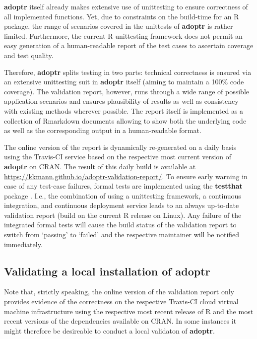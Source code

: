 \documentclass[
]{book}
\begin{document}
\textbf{adoptr} itself already makes extensive use of unittesting to
ensure correctness of all implemented functions.
Yet, due to constraints on the build-time for an R package,
the range of scenarios covered in the unittests of \textbf{adoptr} is
rather limited.
Furthermore, the current R unittesting framework does not permit
an easy generation of a human-readable report of the test cases
to ascertain coverage and test quality.

Therefore, \textbf{adoptr} splits testing in two parts: technical
correctness is ensured via an extensive unittesting suit in \textbf{adoptr}
itself (aiming to maintain a 100\% code coverage).
The validation report, however, runs through a wide range of possible
application scenarios and ensures plausibility of results as well
as consistency with existing methods wherever possible.
The report itself is implemented as a collection of Rmarkdown documents
allowing to show both the underlying code as well as the corresponding
output in a human-readable format.

The online version of the report is dynamically re-generated on a
daily basis using the Travis-CI service based on the respective
most current version of \textbf{adoptr} on CRAN.
The result of this daily build is available at
\url{https://kkmann.github.io/adoptr-validation-report/}.
To ensure early warning in case of any test-case failures,
formal tests are implemented using the \textbf{testthat} package
\citep{R-testthat}.
I.e., the combination of using a unittesting framework, a continuous
integration, and continuous deployment service leads to an always
up-to-date validation report (build on the current R release on Linux).
Any failure of the integrated formal tests will cause the build status
of the validation report to switch from `passing' to `failed' and
the respective maintainer will be notified immediately.

\hypertarget{validating-a-local-installation-of-adoptr}{%
\subsection{Validating a local installation of adoptr}\label{validating-a-local-installation-of-adoptr}}

Note that, strictly speaking, the online version of the validation
report only provides evidence of the correctness on the respective
Travis-CI cloud virtual machine infrastructure using the respective
most recent release of R and the most recent versions of the
dependencies available on CRAN.
In some instances it might therefore be desireable to conduct a
local validaton of \textbf{adoptr}.
\end{document}

